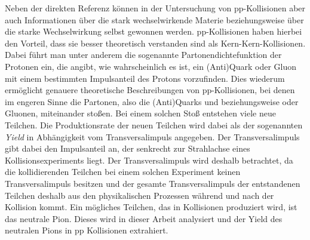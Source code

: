 Neben der direkten Referenz können in der Untersuchung von pp-Kollisionen aber auch Informationen über die stark wechselwirkende Materie beziehungsweise über die starke Wechselwirkung selbst gewonnen werden.
pp-Kollisionen haben hierbei den Vorteil, dass sie besser theoretisch verstanden sind als Kern-Kern-Kollisionen.
Dabei führt man unter anderem die sogenannte Partonendichtefunktion der Protonen ein, die angibt, wie wahrscheinlich es ist, ein (Anti)Quark oder Gluon mit einem bestimmten Impulsanteil des Protons vorzufinden.
Dies wiederum ermöglicht genauere theoretische Beschreibungen von pp-Kollisionen, bei denen im engeren Sinne die Partonen, also die (Anti)Quarks und beziehungsweise oder Gluonen, miteinander stoßen.
\newline
Bei einem solchen Stoß entstehen viele neue Teilchen.
Die Produktionsrate der neuen Teilchen wird dabei als der sogenannten \textit{Yield} in Abhängigkeit vom Transversalimpuls angegeben.
Der Transversalimpuls gibt dabei den Impulsanteil an, der senkrecht zur Strahlachse eines Kollisionsexperiments liegt.
Der Transversalimpuls wird deshalb betrachtet, da die kollidierenden Teilchen bei einem solchen Experiment keinen Transversalimpuls besitzen und der gesamte Transversalimpuls der entstandenen Teilchen deshalb aus den physikalischen Prozessen während und nach der Kollision kommt.
\newline
Ein mögliches Teilchen, das in Kollisionen produziert wird, ist das neutrale Pion.
Dieses wird in dieser Arbeit analysiert und der Yield des neutralen Pions in pp Kollisionen extrahiert.